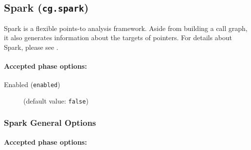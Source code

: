 \documentclass{article}
\begin{document}
\subsection{Spark ({\tt cg.spark})}
Spark is a flexible points-to analysis framework. Aside from building a call graph, it also generates information about the targets of pointers. For details about Spark, please see .

\paragraph{Accepted phase options:} 

\begin{description}

\item[Enabled ({\tt enabled})]
(default value: {\tt false})






\end{description}

\subsubsection{Spark General Options}


\paragraph{Accepted phase options:} 
\end{document}
